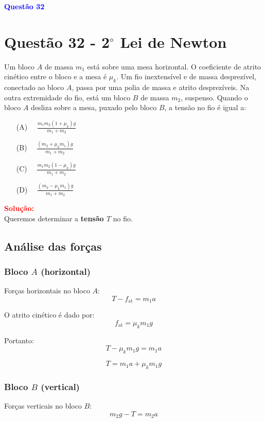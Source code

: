 \documentclass[a4paper,12pt]{article}
\begin{document}
\begin{flushleft}
\textbf{\textcolor{blue}{\Large Quest\~ao 32}}\\
\noindent
\section{Quest\~ao 32 - 2$^{\circ}$ Lei de Newton}
Um bloco \(A\) de massa \(m_1\) está sobre uma mesa horizontal.  
O coeficiente de atrito cinético entre o bloco e a mesa é \(\mu_k\).  
Um fio inextensível e de massa desprezível, conectado ao bloco \(A\), passa por uma polia de massa e atrito desprezíveis.  
Na outra extremidade do fio, está um bloco \(B\) de massa \(m_2\), suspenso.  
Quando o bloco \(A\) desliza sobre a mesa, puxado pelo bloco \(B\), a tensão no fio é igual a:


\begin{itemize}
\item[(A)] $\quad \frac{m_1 m_2 (1 + \mu_k) g}{m_1 + m_2}
\qquad$
\item[(B)] $\quad \frac{(m_2 + \mu_k m_1) g}{m_1 + m_2}\qquad$
\item[(C)] $\quad \frac{m_1 m_2 (1 - \mu_k) g}{m_1 + m_2}
\qquad$
\item[(D)] $\quad \frac{(m_2 - \mu_k m_1) g}{m_1 + m_2}$
\end{itemize}

\vspace{0.5cm}


\textcolor{red}{\textbf{Solução:}}\\

Queremos determinar a \textbf{tensão \( T \)} no fio.

\subsection*{Análise das forças}

\subsubsection*{Bloco \( A \) (horizontal)}
Forças horizontais no bloco \( A \):
\[
T - f_{\text{at}} = m_1 a
\]

O atrito cinético é dado por:
\[
f_{\text{at}} = \mu_k m_1 g
\]

Portanto:
\[
T - \mu_k m_1 g = m_1 a
\]

\[
T = m_1 a + \mu_k m_1 g
\]

\subsubsection*{Bloco \( B \) (vertical)}
Forças verticais no bloco \( B \):
\[
m_2 g - T = m_2 a
\]


\end{flushleft}
\end{document}
